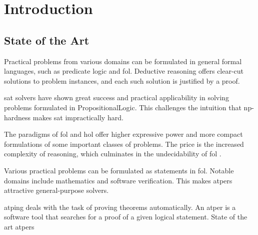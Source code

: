 

\chapter{Introduction}
\glsresetall

\section{State of the Art}
\label{sec:sota}

Practical problems from various domains can be formulated in general formal languages,
such as predicate logic and \gls{fol}.
Deductive reasoning offers clear-cut solutions to problem instances,
and each such solution is justified by a proof.

\Gls{sat} solvers have shown great success and practical applicability in solving problems formulated in \gls{PropositionalLogic}.
This challenges the intuition that \acrshort{np}-hardness makes \gls{sat} impractically hard.

The paradigms of \gls{fol} and \gls{hol} offer higher expressive power and more compact formulations of some important classes of problems.
The price is the increased complexity of reasoning,
which culminates in the undecidability of \gls{fol} \cite{}.


Various practical problems can be formulated as statements in \gls{fol}.
Notable domains include mathematics and software verification.
This makes \glspl{atper} attractive general-purpose solvers.

\Gls{atping} deals with the task of proving theorems automatically.
An \gls{atper} is a software tool that searches for a proof of a given logical statement.
State of the art \glspl{atper}



